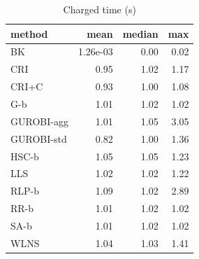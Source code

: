 \begin{table}[htbp]
\centering
\small
\caption{Charged time (s)}
\label{tab:E4a_equal_budgets_b1_time}
\begin{tabular}{lrrr}
\toprule
method & mean & median & max \\
\midrule
BK & 1.26e-03 & 0.00 & 0.02 \\
CRI & 0.95 & 1.02 & 1.17 \\
CRI+C & 0.93 & 1.00 & 1.08 \\
G-b & 1.01 & 1.02 & 1.02 \\
GUROBI-agg & 1.01 & 1.05 & 3.05 \\
GUROBI-std & 0.82 & 1.00 & 1.36 \\
HSC-b & 1.05 & 1.05 & 1.23 \\
LLS & 1.02 & 1.02 & 1.22 \\
RLP-b & 1.09 & 1.02 & 2.89 \\
RR-b & 1.01 & 1.02 & 1.02 \\
SA-b & 1.01 & 1.02 & 1.02 \\
WLNS & 1.04 & 1.03 & 1.41 \\
\bottomrule
\end{tabular}
\end{table}
